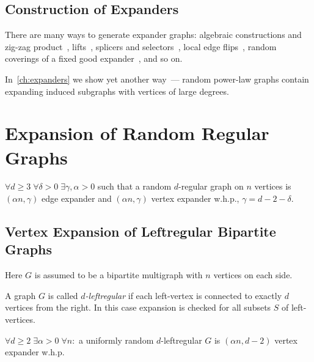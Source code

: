 \subsection{Construction of Expanders}

There are many ways to generate expander graphs:
algebraic constructions and zig-zag product~\cite{hlw06,vad12},
lifts~\cite{al06}, splicers and selectors~\cite{fgrv14},
local edge flips~\cite{ablmo16},
random coverings of a fixed good expander~\cite{pud15}, and so on.

In~\autoref{ch:expanders} we show yet another way~--- random power-law graphs
contain expanding induced subgraphs with vertices of large degrees.

\section{Expansion of Random Regular Graphs}

\begin{theorem}
    $\forall d\geq3\;\forall \delta>0\;\exists\gamma,\alpha>0$ such that
    a random $d$-regular graph on $n$ vertices is
    $(\alpha n,\gamma)$ edge expander and $(\alpha n,\gamma)$ vertex expander w.h.p.,
    $\gamma=d-2-\delta$.
\end{theorem}

\subsection{Vertex Expansion of Leftregular Bipartite Graphs}

Here $G$ is assumed to be a bipartite multigraph with $n$ vertices on each side.

\begin{definition}
    A graph $G$ is called \textit{$d$-leftregular}
    if each left-vertex is connected to exactly $d$ vertices from the right.
    In this case expansion is checked for all subsets $S$ of left-vertices.
\end{definition}

\begin{theorem}
    $\forall d\geq2\;\exists\alpha>0\;\forall n:$ a uniformly random $d$-leftregular $G$
    is $(\alpha n,d-2)$ vertex expander w.h.p.
\end{theorem}

